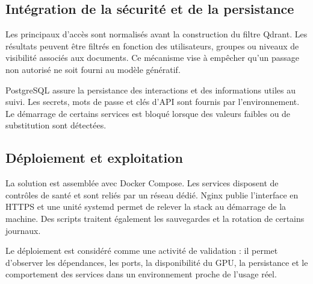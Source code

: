 \subsection{Intégration de la sécurité et de la persistance}

Les principaux d'accès sont normalisés avant la construction du filtre Qdrant. Les résultats peuvent être filtrés en fonction des utilisateurs, groupes ou niveaux de visibilité associés aux documents. Ce mécanisme vise à empêcher qu'un passage non autorisé ne soit fourni au modèle génératif.

PostgreSQL assure la persistance des interactions et des informations utiles au suivi. Les secrets, mots de passe et clés d'API sont fournis par l'environnement. Le démarrage de certains services est bloqué lorsque des valeurs faibles ou de substitution sont détectées.

\subsection{Déploiement et exploitation}

La solution est assemblée avec Docker Compose. Les services disposent de contrôles de santé et sont reliés par un réseau dédié. Nginx publie l'interface en HTTPS et une unité systemd permet de relever la stack au démarrage de la machine. Des scripts traitent également les sauvegardes et la rotation de certains journaux.

Le déploiement est considéré comme une activité de validation : il permet d'observer les dépendances, les ports, la disponibilité du GPU, la persistance et le comportement des services dans un environnement proche de l'usage réel.

